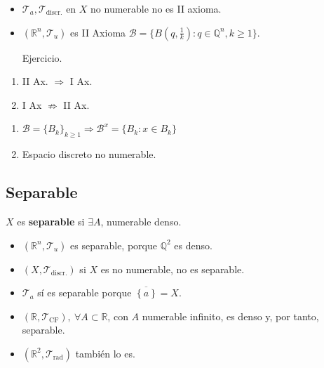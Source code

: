 \begin{ej}
\begin{itemize}
    \item $\mathcal{T}_a, \mathcal{T}_{\text{discr.}}$ en $X$ no numerable no es II axioma.
    \item $\left( \mathbb{R}^n, \mathcal{T}_{u} \right)$ es II Axioma $\mathcal{B} = \{B \left( q, \frac{1}{k}\right) : q \in \mathbb{Q}^n, k \ge 1 \}$.
    \begin{demo}
        Ejercicio.
    \end{demo}
\end{itemize}
\end{ej}

\begin{prop}
\begin{enumerate}
    \item II Ax. $\Rightarrow$ I Ax. 
    \item I Ax $\not \Rightarrow$ II Ax. 
\end{enumerate}
\end{prop}
\begin{demo}
\begin{enumerate}
    \item $\mathcal{B} = \{B_k\}_{k \ge 1} \Rightarrow \mathcal{B}^x = \{B_k : x \in B_k\}$
    \item Espacio discreto no numerable.
\end{enumerate}
\end{demo}

\subsection{Separable}%
\label{sub:separable}
\begin{defi}[Separable]
$X$ es \textbf{separable} si $\exists A$, numerable denso.
\end{defi}

\begin{ej}
\begin{itemize}
    \item $\left( \mathbb{R}^n, \mathcal{T}_u \right)$ es separable, porque $\mathbb{Q}^2$ es denso.
    \item $\left( X, \mathcal{T}_{\text{discr.}} \right)$ si $X$ es no numerable, no es separable.
    \item $\mathcal{T}_a$ sí es separable porque $\overline{\left\{ a \right\}} = X$.
    \item $\left( \mathbb{R}, \mathcal{T}_{\text{CF}} \right),\ \forall A \subset \mathbb{R}$, con $A$ numerable infinito, es denso y, por tanto, separable. 
    \item $\left( \mathbb{R}^2, \mathcal{T}_{\text{rad}} \right)$ también lo es. %
\end{itemize}
\end{ej}

